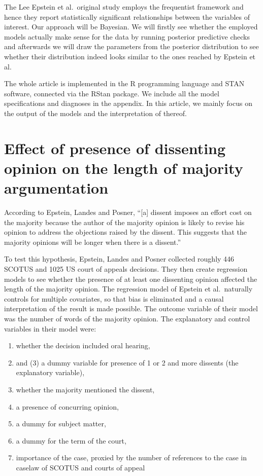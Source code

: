 \documentclass[
  11pt,
]{article}
\providecommand{\tightlist}{%
  \setlength{\itemsep}{0pt}\setlength{\parskip}{0pt}}
\begin{document}
The Lee Epstein et al.~original study employs the frequentist framework
and hence they report statistically significant relationships between
the variables of interest. Our approach will be Bayesian. We will
firstly see whether the employed models actually make sense for the data
by running posterior predictive checks and afterwards we will draw the
parameters from the posterior distribution to see whether their
distribution indeed looks similar to the ones reached by Epstein et al.

The whole article is implemented in the R programming language and STAN
software, connected via the RStan package. We include all the model
specifications and diagnoses in the appendix. In this article, we mainly
focus on the output of the models and the interpretation of thereof.

\hypertarget{effect-of-presence-of-dissenting-opinion-on-the-length-of-majority-argumentation}{%
\section{Effect of presence of dissenting opinion on the length of
majority
argumentation}\label{effect-of-presence-of-dissenting-opinion-on-the-length-of-majority-argumentation}}

According to Epstein, Landes and Posner, ``{[}a{]} dissent imposes an
effort cost on the majority because the author of the majority opinion
is likely to revise his opinion to address the objections raised by the
dissent. This suggests that the majority opinions will be longer when
there is a dissent.''

To test this hypothesis, Epstein, Landes and Posner collected roughly
446 SCOTUS and 1025 US court of appeals decisions. They then create
regression models to see whether the presence of at least one dissenting
opinion affected the length of the majority opinion. The regression
model of Epstein et al.~naturally controls for multiple covariates, so
that bias is eliminated and a causal interpretation of the result is
made possible. The outcome variable of their model was the number of
words of the majority opinion. The explanatory and control variables in
their model were:

\begin{enumerate}
\def\labelenumi{(\arabic{enumi})}
\tightlist
\item
  whether the decision included oral hearing,
\item
  and (3) a dummy variable for presence of 1 or 2 and more dissents (the
  explanatory variable),
\item
  whether the majority mentioned the dissent,
\item
  a presence of concurring opinion,
\item
  a dummy for subject matter,
\item
  a dummy for the term of the court,
\item
  importance of the case, proxied by the number of references to the
  case in caselaw of SCOTUS and courts of appeal
\end{enumerate}
\end{document}
